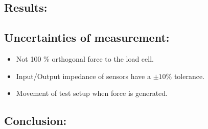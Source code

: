 \subsection*{Results:}


%

\subsection*{Uncertainties of measurement:}
\begin{itemize}
\item Not 100 \% orthogonal force to the load cell.
\item Input/Output impedance of sensors have a $\pm 10 \%$ tolerance.
\item Movement of test setup when force is generated.
\end{itemize}

\subsection*{Conclusion:}
